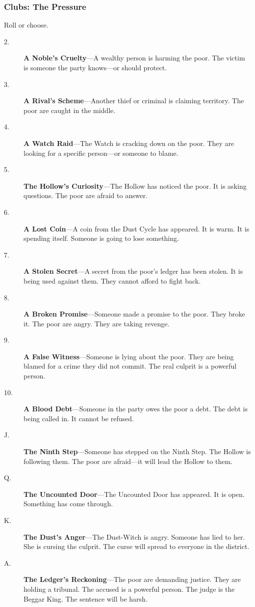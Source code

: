 \documentclass[11pt]{article}
\begin{document}
\subsubsection{Clubs: The Pressure}
Roll or choose.

\begin{description}
\item[2.] \textbf{A Noble's Cruelty}—A wealthy person is harming the poor. The victim is someone the party knows—or should protect.
\item[3.] \textbf{A Rival's Scheme}—Another thief or criminal is claiming territory. The poor are caught in the middle.
\item[4.] \textbf{A Watch Raid}—The Watch is cracking down on the poor. They are looking for a specific person—or someone to blame.
\item[5.] \textbf{The Hollow's Curiosity}—The Hollow has noticed the poor. It is asking questions. The poor are afraid to answer.
\item[6.] \textbf{A Lost Coin}—A coin from the Dust Cycle has appeared. It is warm. It is spending itself. Someone is going to lose something.
\item[7.] \textbf{A Stolen Secret}—A secret from the poor’s ledger has been stolen. It is being used against them. They cannot afford to fight back.
\item[8.] \textbf{A Broken Promise}—Someone made a promise to the poor. They broke it. The poor are angry. They are taking revenge.
\item[9.] \textbf{A False Witness}—Someone is lying about the poor. They are being blamed for a crime they did not commit. The real culprit is a powerful person.
\item[10.] \textbf{A Blood Debt}—Someone in the party owes the poor a debt. The debt is being called in. It cannot be refused.
\item[J.] \textbf{The Ninth Step}—Someone has stepped on the Ninth Step. The Hollow is following them. The poor are afraid—it will lead the Hollow to them.
\item[Q.] \textbf{The Uncounted Door}—The Uncounted Door has appeared. It is open. Something has come through.
\item[K.] \textbf{The Dust's Anger}—The Dust‑Witch is angry. Someone has lied to her. She is cursing the culprit. The curse will spread to everyone in the district.
\item[A.] \textbf{The Ledger's Reckoning}—The poor are demanding justice. They are holding a tribunal. The accused is a powerful person. The judge is the Beggar King. The sentence will be harsh.
\end{description}
\end{document}
